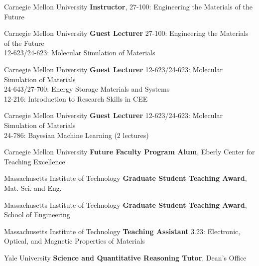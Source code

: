     {Carnegie Mellon University}
    {\textbf{Instructor}, 27-100: Engineering the Materials of the Future}{}

\vspace{-3.5mm}
    {Carnegie Mellon University}
    {\textbf{Guest Lecturer}}
    {27-100: Engineering the Materials of the Future\\
    12-623/24-623: Molecular Simulation of Materials}

\vspace{-3mm}
    {Carnegie Mellon University}
    {\textbf{Guest Lecturer}}
    {12-623/24-623: Molecular Simulation of Materials\\
    24-643/27-700: Energy Storage Materials and Systems\\
    12-216: Introduction to Research Skills in CEE}

\vspace{-3mm}
    {Carnegie Mellon University}
    {\textbf{Guest Lecturer}}
    {12-623/24-623: Molecular Simulation of Materials\\
    24-786: Bayesian Machine Learning (2 lectures)}

\vspace{2.2mm}
\datedsubsectionnarrow{}
    {Carnegie Mellon University}
    {\textbf{Future Faculty Program Alum}, Eberly Center for Teaching Excellence}{}

\vspace{2.2mm}
    {Massachusetts Institute of Technology}
    {\textbf{Graduate Student Teaching Award}, Mat. Sci. and Eng.}{}

\datedsubsectionnarrow{}
    {Massachusetts Institute of Technology}
    {\textbf{Graduate Student Teaching Award}, School of Engineering}{}

\vspace{-3mm}
    {Massachusetts Institute of Technology}
    {\textbf{Teaching Assistant}}
    {3.23: Electronic, Optical, and Magnetic Properties of Materials}

\vspace{2.2mm}
    {Yale University}
    {\textbf{Science and Quantitative Reasoning Tutor}, Dean's Office}{}
